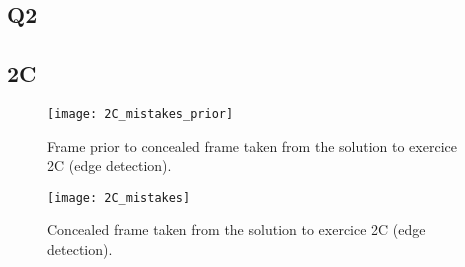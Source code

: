 \newpage
\begin{appendices}

\section{Q2}\label{app:Q2}

\subsection{2C}

\begin{figure}[!h]
  \centering
  \texttt{[image: 2C\_mistakes\_prior]}
  \caption{Frame prior to concealed frame taken from the solution to exercice 2C (edge detection).} 
  \label{fig:2C_prior}
\end{figure}

\begin{figure}[!h]
  \centering
  \texttt{[image: 2C\_mistakes]}
  \caption{Concealed frame taken from the solution to exercice 2C (edge detection).} 
  \label{fig:2C}
\end{figure}

\newpage


\end{appendices}
